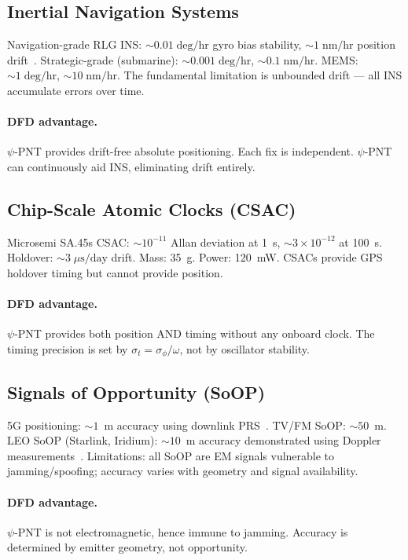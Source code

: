 \documentclass[twocolumn,superscriptaddress,prd,nofootinbib]{revtex4-2}
\begin{document}
\subsection{Inertial Navigation Systems}

Navigation-grade RLG INS: $\sim 0.01\;\text{deg/hr}$ gyro bias
stability, $\sim 1\;\text{nm/hr}$ position
drift~\cite{Titterton2004INS}. Strategic-grade (submarine):
$\sim 0.001\;\text{deg/hr}$, $\sim 0.1\;\text{nm/hr}$. MEMS:
$\sim 1\;\text{deg/hr}$, $\sim 10\;\text{nm/hr}$.
The fundamental limitation is unbounded drift --- all INS accumulate
errors over time.

\paragraph{DFD advantage.}
$\psi$-PNT provides drift-free absolute positioning. Each fix is
independent. $\psi$-PNT can continuously aid INS, eliminating drift
entirely.

\subsection{Chip-Scale Atomic Clocks (CSAC)}

Microsemi SA.45s CSAC: $\sim 10^{-11}$ Allan deviation at 1~s,
$\sim 3\times 10^{-12}$ at 100~s. Holdover: $\sim 3\;\mu\text{s/day}$
drift. Mass: 35~g. Power: 120~mW. CSACs provide GPS holdover timing
but cannot provide position.

\paragraph{DFD advantage.}
$\psi$-PNT provides both position AND timing without any onboard clock.
The timing precision is set by $\sigma_t = \sigma_\phi/\omega$, not by
oscillator stability.

\subsection{Signals of Opportunity (SoOP)}

5G positioning: $\sim 1$~m accuracy using downlink PRS~\cite{3GPP2022}.
TV/FM SoOP: $\sim 50$~m. LEO SoOP (Starlink, Iridium): $\sim 10$~m
accuracy demonstrated using Doppler
measurements~\cite{Humphreys2020LEO}. Limitations: all SoOP are EM
signals vulnerable to jamming/spoofing; accuracy varies with geometry
and signal availability.

\paragraph{DFD advantage.}
$\psi$-PNT is not electromagnetic, hence immune to jamming. Accuracy
is determined by emitter geometry, not opportunity.
\end{document}
